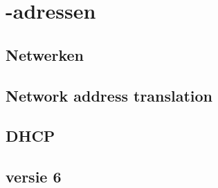 \chapter{-adressen}
\label{chap:ip-addr}

\section{Netwerken}


\section{Network address translation}


\section{DHCP}

\section{ versie 6}